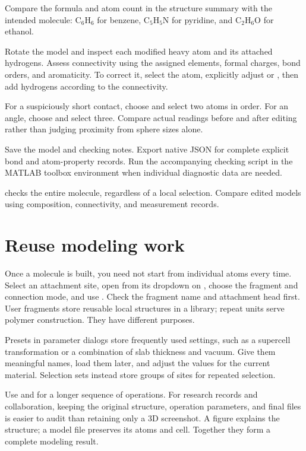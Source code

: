 \begin{steps}
  \item Compare the formula and atom count in the structure summary with the intended molecule: $\mathrm{C_6H_6}$ for benzene, $\mathrm{C_5H_5N}$ for pyridine, and $\mathrm{C_2H_6O}$ for ethanol.
  \item Rotate the model and inspect each modified heavy atom and its attached hydrogens. Assess connectivity using the assigned elements, formal charges, bond orders, and aromaticity. To correct it, select the atom, explicitly adjust  or , then add hydrogens according to the connectivity.
  \item For a suspiciously short contact, choose  and select two atoms in order. For an angle, choose  and select three. Compare actual readings before and after editing rather than judging proximity from sphere sizes alone.
  \item Save the model and checking notes. Export native JSON for complete explicit bond and atom-property records. Run the accompanying checking script in the MATLAB\regmark{} toolbox environment when individual diagnostic data are needed.
\end{steps}

 checks the entire molecule, regardless of a local selection. Compare edited models using composition, connectivity, and measurement records.

\section{Reuse modeling work}

Once a molecule is built, you need not start from individual atoms every time. Select an attachment site, open  from its dropdown on , choose the fragment and connection mode, and use . Check the fragment name and attachment head first. User fragments store reusable local structures in a library; repeat units serve polymer construction. They have different purposes.

Presets in parameter dialogs store frequently used settings, such as a supercell transformation or a combination of slab thickness and vacuum. Give them meaningful names, load them later, and adjust the values for the current material. Selection sets instead store groups of sites for repeated selection.

Use  and  for a longer sequence of operations. For research records and collaboration, keeping the original structure, operation parameters, and final files is easier to audit than retaining only a 3D screenshot. A figure explains the structure; a model file preserves its atoms and cell. Together they form a complete modeling result.
